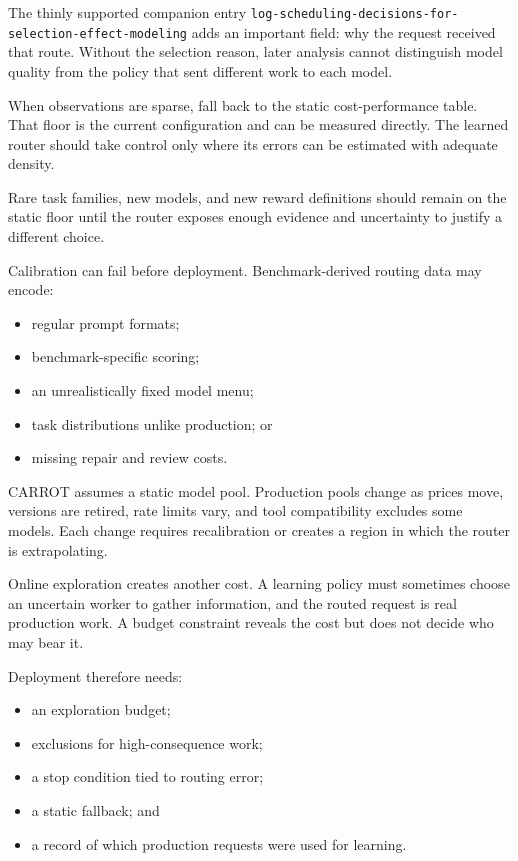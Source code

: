 The thinly supported companion entry \texttt{log-scheduling-decisions-for-selection-effect-modeling} adds an important field: why the request received that route. Without the selection reason, later analysis cannot distinguish model quality from the policy that sent different work to each model.

When observations are sparse, fall back to the static cost-performance table. That floor is the current configuration and can be measured directly. The learned router should take control only where its errors can be estimated with adequate density.

Rare task families, new models, and new reward definitions should remain on the static floor until the router exposes enough evidence and uncertainty to justify a different choice.


Calibration can fail before deployment. Benchmark-derived routing data may encode:

\begin{itemize}
\tightlist
\item
  regular prompt formats;
\item
  benchmark-specific scoring;
\item
  an unrealistically fixed model menu;
\item
  task distributions unlike production; or
\item
  missing repair and review costs.
\end{itemize}

CARROT assumes a static model pool. Production pools change as prices move, versions are retired, rate limits vary, and tool compatibility excludes some models. Each change requires recalibration or creates a region in which the router is extrapolating.

Online exploration creates another cost. A learning policy must sometimes choose an uncertain worker to gather information, and the routed request is real production work. A budget constraint reveals the cost but does not decide who may bear it.


Deployment therefore needs:

\begin{itemize}
\tightlist
\item
  an exploration budget;
\item
  exclusions for high-consequence work;
\item
  a stop condition tied to routing error;
\item
  a static fallback; and
\item
  a record of which production requests were used for learning.
\end{itemize}

